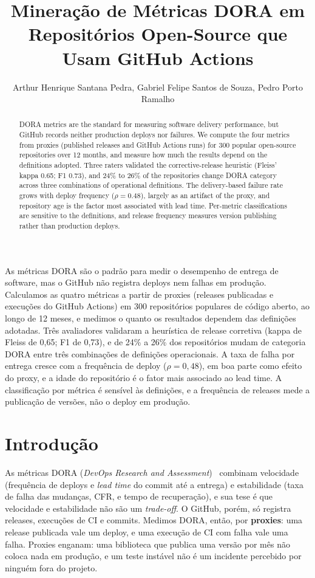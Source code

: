 \documentclass[12pt]{article}
\title{Mineração de Métricas DORA em Repositórios Open-Source que Usam GitHub Actions}
\author{Arthur Henrique Santana Pedra\inst{1}, Gabriel Felipe Santos de Souza\inst{1}, Pedro Porto Ramalho\inst{1}}
\begin{document}
\maketitle

\begin{abstract}
DORA metrics are the standard for measuring software delivery performance, but GitHub records neither production deploys nor failures. We compute the four metrics from proxies (published releases and GitHub Actions runs) for 300 popular open-source repositories over 12 months, and measure how much the results depend on the definitions adopted. Three raters validated the corrective-release heuristic (Fleiss' kappa 0.65; F1 0.73), and 24\% to 26\% of the repositories change DORA category across three combinations of operational definitions. The delivery-based failure rate grows with deploy frequency ($\rho=0.48$), largely as an artifact of the proxy, and repository age is the factor most associated with lead time. Per-metric classifications are sensitive to the definitions, and release frequency measures version publishing rather than production deploys.
\end{abstract}

\begin{resumo}
As métricas DORA são o padrão para medir o desempenho de entrega de software, mas o GitHub não registra deploys nem falhas em produção. Calculamos as quatro métricas a partir de proxies (releases publicadas e execuções do GitHub Actions) em 300 repositórios populares de código aberto, ao longo de 12 meses, e medimos o quanto os resultados dependem das definições adotadas. Três avaliadores validaram a heurística de release corretiva (kappa de Fleiss de 0,65; F1 de 0,73), e de 24\% a 26\% dos repositórios mudam de categoria DORA entre três combinações de definições operacionais. A taxa de falha por entrega cresce com a frequência de deploy ($\rho=0{,}48$), em boa parte como efeito do proxy, e a idade do repositório é o fator mais associado ao lead time. A classificação por métrica é sensível às definições, e a frequência de releases mede a publicação de versões, não o deploy em produção.
\end{resumo}

\section{Introdução}
\label{sec:intro}

As métricas DORA (\emph{DevOps Research and Assessment})~\cite{forsgren2018,dora_fourkeys} combinam velocidade (frequência de deploys e \emph{lead time} do commit até a entrega) e estabilidade (taxa de falha das mudanças, CFR, e tempo de recuperação), e sua tese é que velocidade e estabilidade não são um \emph{trade-off}. O GitHub, porém, só registra releases, execuções de CI e commits. Medimos DORA, então, por \textbf{proxies}: uma release publicada vale um deploy, e uma execução de CI com falha vale uma falha. Proxies enganam: uma biblioteca que publica uma versão por mês não coloca nada em produção, e um teste instável não é um incidente percebido por ninguém fora do projeto.
\end{document}
